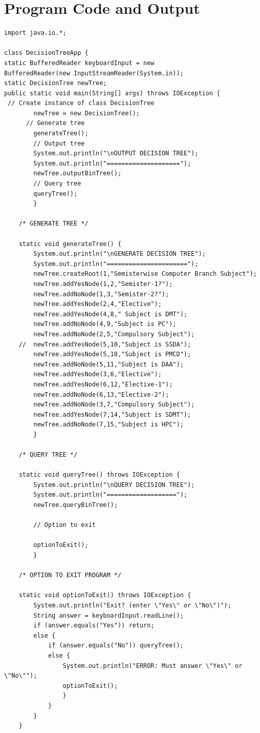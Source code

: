 \documentclass[12pt]{article}
\begin{document}
\section{Program Code and Output}
\begin{verbatim}
import java.io.*;

class DecisionTreeApp {
static BufferedReader keyboardInput = new
BufferedReader(new InputStreamReader(System.in));
static DecisionTree newTree;
public static void main(String[] args) throws IOException {
 // Create instance of class DecisionTree
        newTree = new DecisionTree();
      // Generate tree
        generateTree();
        // Output tree
        System.out.println("\nOUTPUT DECISION TREE");
        System.out.println("====================");
        newTree.outputBinTree();
        // Query tree
        queryTree();
        }

    /* GENERATE TREE */

    static void generateTree() {
        System.out.println("\nGENERATE DECISION TREE");
        System.out.println("======================");
        newTree.createRoot(1,"Semisterwise Computer Branch Subject");
        newTree.addYesNode(1,2,"Semister-1?");
        newTree.addNoNode(1,3,"Semister-2?");
        newTree.addYesNode(2,4,"Elective");
     	newTree.addYesNode(4,8," Subject is DMT");
    	newTree.addNoNode(4,9,"Subject is PC");
    	newTree.addNoNode(2,5,"Compulsory Subject");
    //  newTree.addYesNode(5,10,"Subject is SSDA");
        newTree.addYesNode(5,10,"Subject is PMCD");
    	newTree.addNoNode(5,11,"Subject is DAA");
        newTree.addYesNode(3,6,"Elective");
    	newTree.addYesNode(6,12,"Elective-1");
    	newTree.addNoNode(6,13,"Elective-2");
        newTree.addNoNode(3,7,"Compulsory Subject");
    	newTree.addYesNode(7,14,"Subject is SDMT");
    	newTree.addNoNode(7,15,"Subject is HPC");
        }

    /* QUERY TREE */
    
    static void queryTree() throws IOException {
        System.out.println("\nQUERY DECISION TREE");
        System.out.println("===================");
        newTree.queryBinTree();

        // Option to exit

        optionToExit();
        }

    /* OPTION TO EXIT PROGRAM */

    static void optionToExit() throws IOException {
        System.out.println("Exit? (enter \"Yes\" or \"No\")");
        String answer = keyboardInput.readLine();
        if (answer.equals("Yes")) return;
        else {
            if (answer.equals("No")) queryTree();
            else {
                System.out.println("ERROR: Must answer \"Yes\" or \"No\"");
                optionToExit();
                }
            }
        }
    }
    

\end{verbatim}
\end{document}
